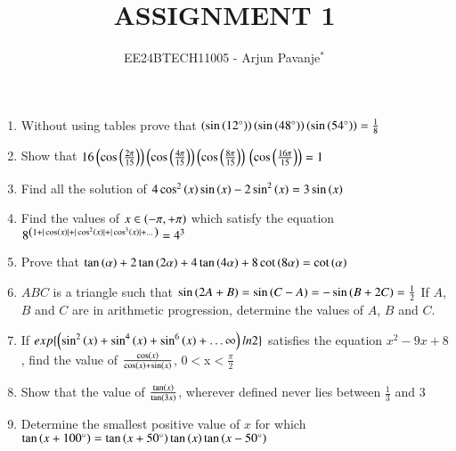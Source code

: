 \documentclass[journal,12pt,article,twocolumn]{IEEEtran}
\theoremstyle{remark}
\begin{document}

\vspace{3cm}

\title{ASSIGNMENT 1}
\author{EE24BTECH11005 - Arjun Pavanje$^{*}$%
}
\maketitle
\newpage
\bigskip
\begin{enumerate}
\item Without using tables prove that $\brak{\sin\brak{12^{\circ}}}\brak{\sin\brak{48^{\circ}}}\brak{\sin\brak{54^{\circ}}}= \frac{1}{8}$\\
\hfill {}
\item Show that $16\brak{\cos\brak{\frac{2\pi}{15}}}\brak{\cos\brak{\frac{4\pi}{15}}}\brak{\cos\brak{\frac{8\pi}{15}}}\\\brak{\cos\brak{\frac{16\pi}{15}}}=1$\\
\hfill{}
\item Find all the solution of $4\cos^2\brak{x} \sin \brak{x} -2\sin^2\brak{x} = 3\sin \brak{x}$
\hfill{}
\item Find the values of $x \in \brak{-\pi, +\pi}$ which satisfy the equation
$8^{\brak{1+|\cos \brak{x}|+|\cos^2\brak{x}|+|\cos^3\brak{x}|+\dots}}= 4^3$\\
\hfill{}
\item Prove that $\tan \brak{\alpha}+2\tan \brak{2\alpha}+4\tan \brak{4\alpha}+8\cot \brak{8\alpha}=\cot \brak{\alpha}$\\
\hfill{}
\item $ABC$ is a triangle such that $\sin{\brak{2A+B}}=\sin{\brak{C-A}}=-\sin{\brak{B+2C}}=\frac{1}{2}$ If $A$, $B$ and $C$ are in arithmetic progression, determine the values of $A$, $B$ and $C$.\\
\hfill{}
\item If $exp \{\brak{\sin^2\brak{x}+\sin^4\brak{x}+\sin^6\brak{x}+\dots\infty}ln2\}$ satisfies the equation $x^2-9x+8$, find the value of $\frac{\cos \brak{x}}{\cos \brak{x} + \sin \brak{x}}$, 0$<$x$<$$\frac{\pi}{2}$\\
\hfill{}
\item Show that the value of  $\frac{\tan \brak{x}}{\tan \brak{3x}}$, wherever defined never lies between $\frac{1}{3}$ and 3\\
\hfill{}
\item Determine the smallest positive value of $x$  for which $\tan {\brak{x+100^{\circ}}}=\tan {\brak{x+50^{\circ}}}\tan \brak{x}\tan {\brak{x-50^{\circ}}}$\\
$$
\end{enumerate}
\end{document}
